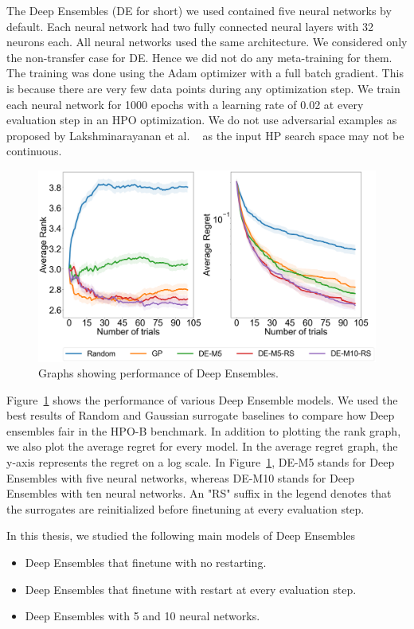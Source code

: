 \documentclass[12pt, twoside, ngerman]{report}
\begin{document}
The Deep Ensembles (DE for short) we used contained five neural networks by default. Each neural network had two fully connected neural layers with 32 neurons each. All neural networks used the same architecture. 
We considered only the non-transfer case for DE. Hence we did not do any meta-training for them.
The training was done using the Adam optimizer with a full batch gradient. This is because there are very few data points during any optimization step. We train each neural network for 1000 epochs with a learning rate of 0.02 at every evaluation step in an HPO optimization.
We do not use adversarial examples as proposed by Lakshminarayanan
 et al. ~\cite{DeepEnsemblePaper} as the input HP search space may not be continuous.

\begin{figure}[h]
  \centering
    \includegraphics[scale=0.25]{images/DEPerformance}
    \caption{Graphs showing performance of Deep Ensembles.}
    \label{fig:DEPerformance}
\end{figure}

Figure~\ref{fig:DEPerformance} shows the performance of various Deep Ensemble models.
We used the best results of Random and Gaussian surrogate baselines to compare how Deep ensembles fair in the HPO-B benchmark.
In addition to plotting the rank graph,  we also plot the average regret for every model.
In the average regret graph, the y-axis represents the regret on a log scale.
In Figure~\ref{fig:DEPerformance},  DE-M5 stands for Deep Ensembles with five neural networks, whereas DE-M10 stands for Deep Ensembles with ten neural networks.
An "RS" suffix in the legend denotes that the surrogates are reinitialized before finetuning at every evaluation step.

In this thesis, we studied the following main models of Deep Ensembles
\begin{itemize}
\item Deep Ensembles that finetune with no restarting.
\item Deep Ensembles that finetune with restart at every evaluation step.
\item Deep Ensembles with 5 and 10 neural networks.
\end{itemize}
\end{document}
